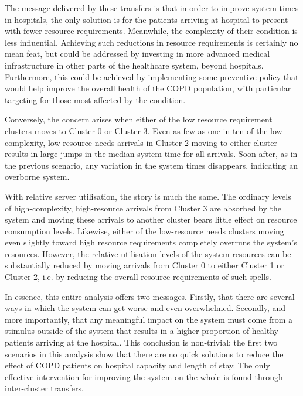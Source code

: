\begin{table}
    \centering%
    \resizebox{\textwidth}{!}{%
        
    }
    \caption{%
        Proportional changes in median relative utilisation for selected cluster
        transfers
    }\label{tab:moving_util}
\end{table}

The message delivered by these transfers is that in order to improve system
times in hospitals, the only solution is for the patients arriving at hospital
to present with fewer resource requirements. Meanwhile, the complexity of their
condition is less influential. Achieving such reductions in resource
requirements is certainly no mean feat, but could be addressed by investing in
more advanced medical infrastructure in other parts of the healthcare system,
beyond hospitals. Furthermore, this could be achieved by implementing some
preventive policy that would help improve the overall health of the COPD
population, with particular targeting for those most-affected by the condition.

Conversely, the concern arises when either of the low resource requirement
clusters moves to Cluster 0 or Cluster 3. Even as few as one in ten of the
low-complexity, low-resource-needs arrivals in Cluster 2 moving to either
cluster results in large jumps in the median system time for all arrivals. Soon
after, as in the previous scenario, any variation in the system times
disappears, indicating an overborne system.

With relative server utilisation, the story is much the same. The ordinary
levels of high-complexity, high-resource arrivals from Cluster 3 are absorbed by
the system and moving these arrivals to another cluster bears little effect on
resource consumption levels. Likewise, either of the low-resource needs clusters
moving even slightly toward high resource requirements completely overruns the
system’s resources. However, the relative utilisation levels of the system
resources can be substantially reduced by moving arrivals from Cluster 0 to
either Cluster 1 or Cluster 2, i.e. by reducing the overall resource
requirements of such spells.

In essence, this entire analysis offers two messages. Firstly, that there are
several ways in which the system can get worse and even overwhelmed. Secondly,
and more importantly, that any meaningful impact on the system must come from a
stimulus outside of the system that results in a higher proportion of healthy
patients arriving at the hospital. This conclusion is non-trivial; the first two
scenarios in this analysis show that there are no quick solutions to reduce the
effect of COPD patients on hospital capacity and length of stay. The only
effective intervention for improving the system on the whole is found through
inter-cluster transfers.


